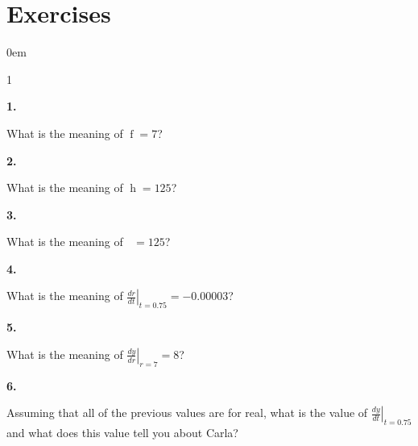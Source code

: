 \documentclass[12pt,]{book}
\theoremstyle{plain}
\theoremstyle{definition}
\numberwithin{equation}{section}
\newenvironment{exercisegroup}%
{\medskip\noindent}%
{\par\bigskip}%
\newlength{\exercisegroupindent}%
\newlength{\exercisegroupitemwidth}%
\newenvironment{exercisegrouplist}%
{\vspace{-\partopsep}%
\begin{adjustwidth}{\exercisegroupindent}{0em}}%
{\end{adjustwidth}%
\vspace{-\partopsep}%
\vspace{\baselineskip}}%
\newenvironment{exercisegroupbycol}[1]%
{\begin{exercisegrouplist}%
\vspace{-\multicolsep}%
\begin{multicols}{#1}%
\setlength{\parindent}{0em}%
\setlength{\exercisegroupitemwidth}{\linewidth}}%
{\end{multicols}%
\vspace{-\multicolsep}%
\end{exercisegrouplist}}%
\newenvironment{exercisegroupitem}[1]%
{\begin{minipage}[t]{\exercisegroupitemwidth}
\vspace{0pt}%
{\bfseries#1}%
\rule{0pt}{\baselineskip}}{\strut%
\end{minipage}%
\hspace{\columnsep}}%
\providecommand\phantomsection{}
\newcommand{\fe}[2]{\mathop{{#1}{\left(#2\right)}}}
\newcommand{\lzoa}[3]{\left.{\frac{d#1}{d#2}}\right|_{#3}}
\begin{document}
\section*{Exercises}\label{exercises-43}

\begin{exercisegroup}%
\begin{exercisegroupbycol}{1}%
\begin{exercisegroupitem}{1. }\phantomsection\hypertarget{exercise-365}{\null}
What is the meaning of \(\fe{f}{0.75}=7\)?%
\end{exercisegroupitem}%
\par%
\begin{exercisegroupitem}{2. }\phantomsection\hypertarget{exercise-366}{\null}
What is the meaning of \(\fe{h}{7}=125\)?%
\end{exercisegroupitem}%
\par%
\begin{exercisegroupitem}{3. }\phantomsection\hypertarget{exercise-367}{\null}
What is the meaning of \(\fe{\left(h\circ f\right)}{0.75}=125\)?%
\end{exercisegroupitem}%
\par%
\begin{exercisegroupitem}{4. }\phantomsection\hypertarget{exercise-368}{\null}
What is the meaning of \(\lzoa{r}{t}{t=0.75}=-0.00003\)?%
\end{exercisegroupitem}%
\par%
\begin{exercisegroupitem}{5. }\phantomsection\hypertarget{exercise-369}{\null}
What is the meaning of \(\lzoa{y}{r}{r=7}=8\)?%
\end{exercisegroupitem}%
\par%
\begin{exercisegroupitem}{6. }\phantomsection\hypertarget{exercise-370}{\null}
Assuming that all of the previous values are for real, what is the value of \(\lzoa{y}{t}{t=0.75}\) and what does this value tell you about Carla?%
\end{exercisegroupitem}%
\par%
\end{exercisegroupbycol}%
\end{exercisegroup}%
\end{document}
